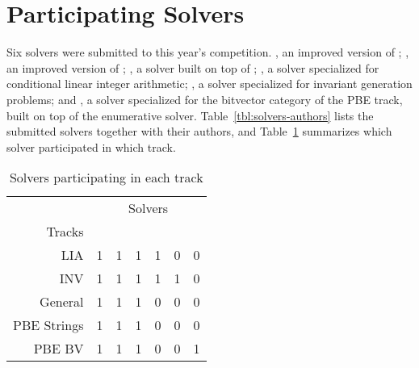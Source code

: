 \section{Participating Solvers}
\label{sec:solvers}
Six solvers were submitted to this year's competition. \eusolvernew, an improved version of \eusolver;  \cvcnew, an improved version of \cvc; \euphony, a solver built on top of \eusolver; \dryd, a solver specialized for conditional linear integer arithmetic;  \lig, a solver specialized for invariant generation problems; and \ethree, a solver specialized for the bitvector category of the PBE track, built on top of the enumerative solver.
Table~\ref{tbl:solvers-authors} lists the submitted solvers together with their authors, and Table~\ref{tbl:solvers-in-tracks} summarizes which solver participated in which track.

\begin{table}[b]
	{\small{
			\begin{center}
			\end{center}
			\caption{Submitted Solvers }
			\label{tbl:solvers-authors}
		}}
\end{table}


\begin{table}[t]
	\begin{center}
		\begin{tabular}{r||rrrrrr}
			& \multicolumn{6}{c}{Solvers} \\
			Tracks & \rot{\eusolvernew} & \rot{\cvcnew} & \rot{\euphony} & \rot{\dryd} & \rot{\lig} & \rot{\ethree} \\ \hline \hline
			LIA         & 1 & 1 & 1 & 1 & 0 & 0 \\
			INV         & 1 & 1 & 1 & 1 & 1 & 0\\
			General     & 1 & 1 & 1 & 0 & 0 & 0\\ 
			PBE Strings & 1 & 1 & 1 & 0 & 0 & 0\\ 
			PBE BV      & 1 & 1 & 1 & 0 & 0 & 1
		\end{tabular}
	\end{center}
	\caption{Solvers participating in each track}
	\label{tbl:solvers-in-tracks}
\end{table}


